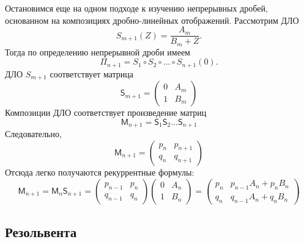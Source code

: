 \documentclass[12pt,a4paper]{article}
\theoremstyle{plain}   \newtheorem{Pro}{Задача}
\begin{document}
Остановимся еще на одном подходе к изучению непрерывных
дробей, основанном на композициях дробно-линейных отображений.
Рассмотрим ДЛО
$$
  S_{m+1}(Z)=\frac{A_m}{B_m +Z}.
$$
Тогда по определению непрерывной дроби имеем
$$
  \Pi _{n+1}= S_1 \circ S_2 \circ ... \circ S_{n+1} (0).
$$
ДЛО
$ S_{m+1} $
соответствует матрица
\begin{equation*}
  \mathsf{S}_{m+1}=
    \begin{pmatrix}
	  0 & A_m \\
	  1 & B_m
	\end{pmatrix}
\end{equation*}
Композиции ДЛО соответствует произведение матриц
$$
  \mathsf{M}_{n+1}=\mathsf{S}_1 \mathsf{S}_2 ...\mathsf{S}_{n+1}
$$
Следовательно,
\begin{equation*}
  \mathsf{M}_{n+1}=
    \begin{pmatrix}
	  p_n & p_{n+1}\\
	  q_n & q_{n+1}
	\end{pmatrix}
\end{equation*}
Отсюда легко получаются рекуррентные формулы:
\begin{equation*}
  \mathsf{M}_{n+1} =\mathsf{M}_n \mathsf{S}_{n+1}=
    \begin{pmatrix}
	  p_{n-1} & p_n \\
	  q_{n-1} & q_n
	\end{pmatrix}
	\begin{pmatrix}
	  0 & A_n \\
	  1 & B_n
	\end{pmatrix}
	=
	  \begin{pmatrix}
	    p_n & p_{n-1}A_n + p_n B_n \\
		q_n & q_{n-1}A_n + q_n B_n
	  \end{pmatrix}
\end{equation*}
\newpage
\subsection{Резольвента}
$ \; $
\\
\end{document}
